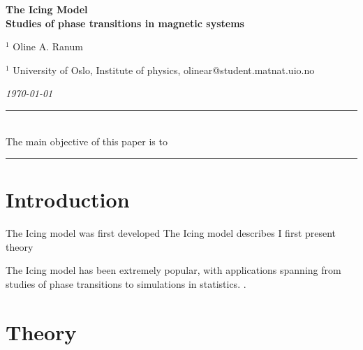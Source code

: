 \documentclass[%
reprint,nofootinbib,
amsmath,amssymb,
aps,
]{revtex4-1}
\newcommand{\HRule}{\rule{\textwidth}{0.5mm}}
\begin{document}
\onecolumngrid

\begin{center}
	\large\textbf{The Icing Model\\ \small{Studies of phase transitions in magnetic systems}}
\end{center}
\vspace{5mm}

\begin{center}
	\small{$^1$ Oline A. Ranum}\\
\end{center}

\begin{center}
	\small{$^1$ University of Oslo, Institute of physics, 
		olinear@student.matnat.uio.no}
\end{center}

\begin{center}
	\textit{\today}
\end{center}
\vspace{7mm}
\noindent 
\HRule \vspace{2mm}\\
The main objective of this paper is to 
\vspace{1.5mm}  \\
\HRule
\vspace{0.3cm}

\twocolumngrid 
\section{Introduction}
The Icing model was first developed
The Icing model describes
I first present theory 

The Icing model has been extremely popular, with applications spanning from studies of phase transitions to simulations in statistics. 
 \newpage. \newpage 
\section{Theory} \noindent 
\end{document}
